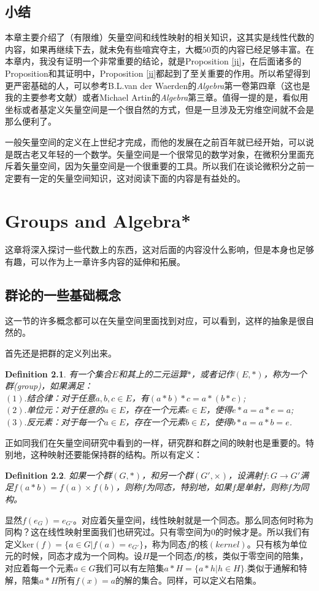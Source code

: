 \documentclass[11pt,a4paper,openany]{book}%
\theoremstyle{plain}%
\newtheorem{defi}{Definition}[chapter]%
\begin{document}
\section{小结}
本章主要介绍了（有限维）矢量空间和线性映射的相关知识，这其实是线性代数的内容，如果再继续下去，就未免有些喧宾夺主，大概50页的内容已经足够丰富。在本章内，我没有证明一个非常重要的结论，就是Proposition \ref{ji}，在后面诸多的Proposition和其证明中，Proposition \ref{ji}都起到了至关重要的作用。所以希望得到更严密基础的人，可以参考B.L.van der Waerden的\textit{Algebra}第一卷第四章（这也是我的主要参考文献）或者Michael Artin的\textit{Algebra}第三章。值得一提的是，看似用坐标或者基定义矢量空间是一个很自然的方式，但是一旦涉及无穷维空间就不会是那么便利了。

一般矢量空间的定义在上世纪才完成，而他的发展在之前百年就已经开始，可以说是既古老又年轻的一个数学。矢量空间是一个很常见的数学对象，在微积分里面充斥着矢量空间，因为矢量空间是一个很重要的工具。所以我们在谈论微积分之前一定要有一定的矢量空间知识，这对阅读下面的内容是有益处的。
\chapter{Groups and Algebra*}
这章将深入探讨一些代数上的东西，这对后面的内容没什么影响，但是本身也足够有趣，可以作为上一章许多内容的延伸和拓展。
\section{群论的一些基础概念}
这一节的许多概念都可以在矢量空间里面找到对应，可以看到，这样的抽象是很自然的。

首先还是把群的定义列出来。
\begin{defi}有一个集合$E$和其上的二元运算$*$，或者记作$(E,*)$，称为一个群\rm{(group)}，如果满足：\\
$(1).$结合律：对于任意$a,b,c\in E$，有$(a*b)*c=a*(b*c)$;\\
$(2).$单位元：对于任意的$a\in E$，存在一个元素$e\in E$，使得$e*a=a*e=a$;\\
$(3).$反元素：对于每一个$a\in E$，存在一个元素$b\in E$，使得$b*a=a*b=e$.
\end{defi}
正如同我们在矢量空间研究中看到的一样，研究群和群之间的映射也是重要的。特别地，这种映射还要能保持群的结构。所以有定义：
\begin{defi}如果一个群$(G,*)$，和另一个群$(G',\times)$，设满射$f:G\rightarrow G'$满足$f(a*b)=f(a)\times f(b)$，则称$f$为同态，特别地，如果$f$是单射，则称$f$为同构。
\end{defi}
显然$f(e_G)=e_{G'}$。对应着矢量空间，线性映射就是一个同态。那么同态何时称为同构？这在线性映射里面我们也研究过。只有零空间为0的时候才是。所以我们有定义$\mathrm{ker}(f)=\{a\in G|f(a)=e_{G'}\}$，称为同态$f$的核$(kernel)$。只有核为单位元的时候，同态才成为一个同构。设$H$是一个同态$f$的核，类似于零空间的陪集，对应着每一个元素$a \in G$我们可以有左陪集$a*H=\{a*h|h \in H\}$.类似于通解和特解，陪集$a*H$所有$f(x)=a$的解的集合。同样，可以定义右陪集。
\end{document}
